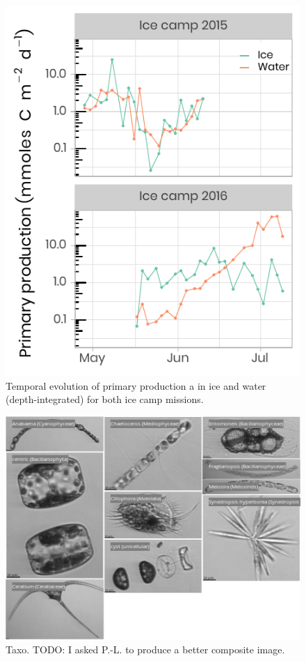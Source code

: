\documentclass[12pt,a4paper]{scrartcl}
\begin{document}
\begin{figure}[h]
	\centering
	\includegraphics[scale = 2]{../../../graphs/fig11.pdf}
	\caption{Temporal evolution of primary production a in ice and water (depth-integrated) for both ice camp missions.}
\end{figure}

\clearpage
\newpage

\begin{figure}[h]
	\centering
	\includegraphics[scale = 1]{../../../graphs/fig12.png}
	\caption{Taxo. TODO: I asked P.-L. to produce a better composite image.}
\end{figure}
\end{document}
